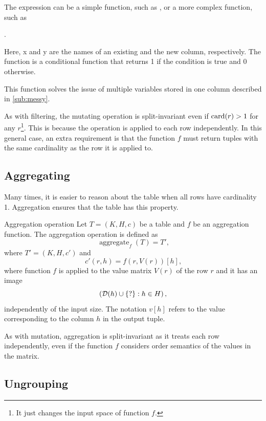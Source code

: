 The expression can be a simple function, such as , or a more complex
function, such as
\begin{center}
  .
\end{center}
Here, x and y are the names of an existing and the new column, respectively. The
 function is a conditional function that returns 1 if the condition
is true and 0 otherwise.

This function solves the issue of multiple variables stored in one column described in
\cref{sub:messy}.

As with filtering, the mutating operation is split-invariant even if $\rowcard[r] > 1$ for
any $r$\footnote{It just changes the input space of function $f$.}.  This is because the
operation is applied to each row independently.  In this general case, an extra
requirement is that the function $f$ must return tuples with the same cardinality as
the row it is applied to.

\subsection{Aggregating}
\label{sub:aggregation}

Many times, it is easier to reason about the table when all rows have cardinality 1.
Aggregation ensures that the table has this property.

\begin{definition}{Aggregation operation}\label{def:aggregating}
  Let $T = (K, H, c)$ be a table and $f$ be an aggregation function.  The aggregation
  operation is defined as \[
    \operatorname{aggregate}_{f}(T) = T'\text{,}
  \] where $T' = (K, H, c')$ and \[
    c'(r, h) = f(r, V(r))[h]\text{,}
  \] where function $f$ is applied to the value matrix $V(r)$ of the row $r$ and it has
  an image $$\left(\domainof{h} \cup \{?\} : h \in H\right)\text{,}$$ independently of the
  input size.  The notation $v[h]$ refers to the value corresponding to the column $h$ in the
  output tuple.
\end{definition}

As with mutation, aggregation is split-invariant as it treats each row independently,
even if the function $f$ considers order semantics of the values in the matrix.

\subsection{Ungrouping}
\label{sub:ungrouping}


